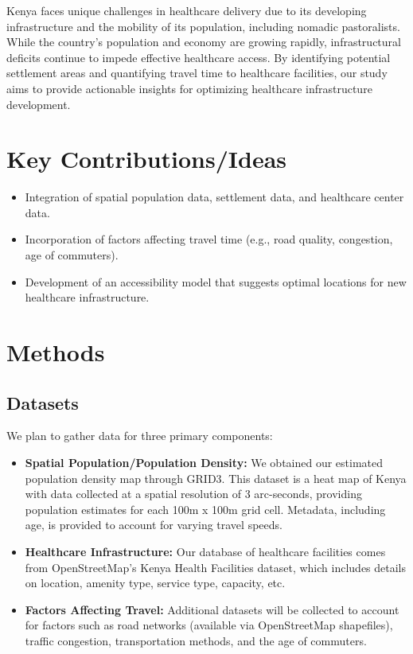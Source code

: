 \documentclass[11pt]{article}
\begin{document}
Kenya faces unique challenges in healthcare delivery due to its developing infrastructure and the mobility of its population, including nomadic pastoralists. While the country's population and economy are growing rapidly, infrastructural deficits continue to impede effective healthcare access. By identifying potential settlement areas and quantifying travel time to healthcare facilities, our study aims to provide actionable insights for optimizing healthcare infrastructure development.

\section{Key Contributions/Ideas}
\begin{itemize}
    \item Integration of spatial population data, settlement data, and healthcare center data.
    \item Incorporation of factors affecting travel time (e.g., road quality, congestion, age of commuters).
    \item Development of an accessibility model that suggests optimal locations for new healthcare infrastructure.
\end{itemize}

\section{Methods}
\subsection{Datasets}
We plan to gather data for three primary components:
\begin{itemize}
    \item \textbf{Spatial Population/Population Density:} We obtained our estimated population density map through GRID3. This dataset is a heat map of Kenya with data collected at a spatial resolution of 3 arc-seconds, providing population estimates for each 100m x 100m grid cell. Metadata, including age, is provided to account for varying travel speeds.
    \item \textbf{Healthcare Infrastructure:} Our database of healthcare facilities comes from OpenStreetMap’s Kenya Health Facilities dataset, which includes details on location, amenity type, service type, capacity, etc.
    \item \textbf{Factors Affecting Travel:} Additional datasets will be collected to account for factors such as road networks (available via OpenStreetMap shapefiles), traffic congestion, transportation methods, and the age of commuters.
\end{itemize}
\end{document}
